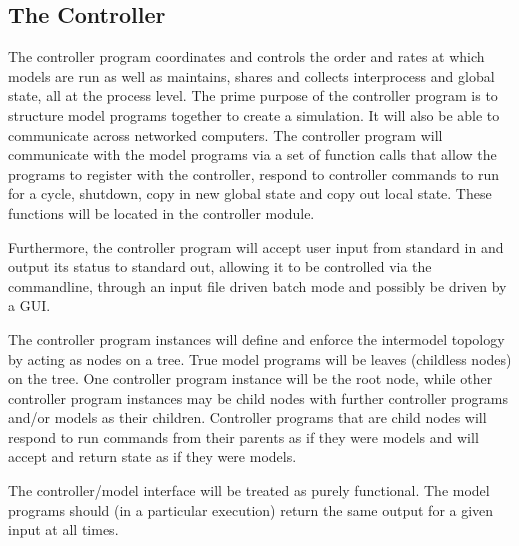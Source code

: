 \documentclass{article}
\begin{document}
\subsection{The Controller}
The controller program coordinates and controls the order and rates at which models are run as well as maintains, shares and collects interprocess and global state, all at the process level. The prime purpose of the controller program is to structure model programs together to create a simulation. It will also be able to communicate across networked computers. The controller program will communicate with the model programs via a set of function  calls that allow the programs to register with the controller, respond to controller commands to run for a cycle, shutdown, copy in new global state and copy out local state. These functions will be located in the controller module.

Furthermore, the controller program will accept user input from standard in and output its status to standard out, allowing it to be controlled via the commandline, through an input file driven batch mode and possibly be driven by a GUI.

The controller program instances will define and enforce the intermodel topology by acting as nodes on a tree.  True model programs will be leaves (childless nodes) on the tree. One controller program instance will be the root node, while other controller program instances may be child nodes with further controller programs and/or models as their children. Controller programs that are child nodes will respond to run commands from their parents as if they were models and will accept and return state as if they were models.

The controller/model interface will be treated as purely functional. The model programs should (in a particular execution) return the same output for a given input at all times. 
\end{document}
